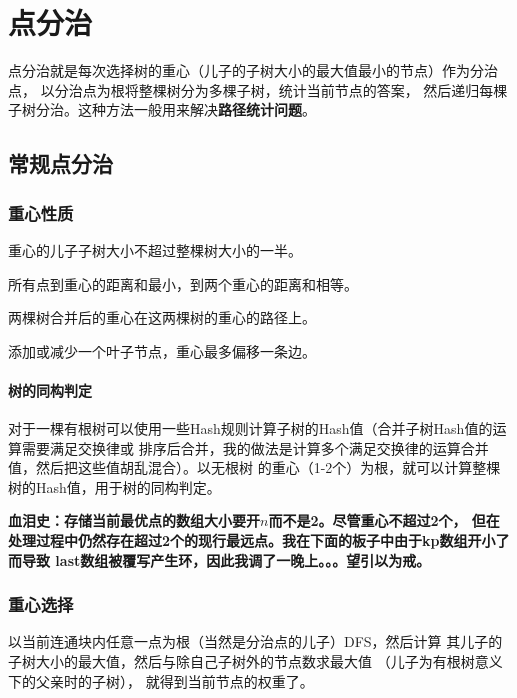 \section{点分治}
点分治就是每次选择树的重心（儿子的子树大小的最大值最小的节点）作为分治点，
以分治点为根将整棵树分为多棵子树，统计当前节点的答案，
然后递归每棵子树分治。这种方法一般用来解决{\bfseries 路径统计问题}。
\subsection{常规点分治}
\subsubsection{重心性质}
\begin{property}\label{WPP}
    重心的儿子子树大小不超过整棵树大小的一半。
\end{property}
\begin{property}
    所有点到重心的距离和最小，到两个重心的距离和相等。
\end{property}
\begin{property}
    两棵树合并后的重心在这两棵树的重心的路径上。
\end{property}
\begin{property}
    添加或减少一个叶子节点，重心最多偏移一条边。
\end{property}

\paragraph{树的同构判定}
对于一棵有根树可以使用一些Hash规则计算子树的Hash值（合并子树Hash值的运算需要满足交换律或
排序后合并，我的做法是计算多个满足交换律的运算合并值，然后把这些值胡乱混合）。以无根树
的重心（1-2个）为根，就可以计算整棵树的Hash值，用于树的同构判定。

{\bfseries 血泪史：存储当前最优点的数组大小要开$n$而不是2。尽管重心不超过2个，
但在处理过程中仍然存在超过2个的现行最远点。我在下面的板子中由于kp数组开小了而导致
last数组被覆写产生环，因此我调了一晚上。。。望引以为戒。}



\subsubsection{重心选择}
以当前连通块内任意一点为根（当然是分治点的儿子）DFS，然后计算
其儿子的子树大小的最大值，然后与除自己子树外的节点数求最大值
（儿子为有根树意义下的父亲时的子树），
就得到当前节点的权重了。

